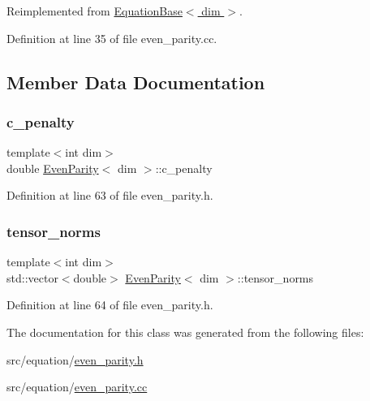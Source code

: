 Reimplemented from \hyperlink{class_equation_base_a39f0465a523e038302f624f89c08a2ee}{Equation\+Base$<$ dim $>$}.



Definition at line 35 of file even\+\_\+parity.\+cc.



\subsection{Member Data Documentation}
\mbox{\label{class_even_parity_a0eeae2ea4837040ebd8df4a997d82acd}} 
\subsubsection{\texorpdfstring{c\+\_\+penalty}{c\_penalty}}
{\footnotesize\ttfamily template$<$int dim$>$ \\
double \hyperlink{class_even_parity}{Even\+Parity}$<$ dim $>$\+::c\+\_\+penalty\hspace{0.3cm}{\ttfamily [private]}}



Definition at line 63 of file even\+\_\+parity.\+h.

\mbox{\label{class_even_parity_aca63481c4a5de27e6acc2fc72d802303}} 
\subsubsection{\texorpdfstring{tensor\+\_\+norms}{tensor\_norms}}
{\footnotesize\ttfamily template$<$int dim$>$ \\
std\+::vector$<$double$>$ \hyperlink{class_even_parity}{Even\+Parity}$<$ dim $>$\+::tensor\+\_\+norms\hspace{0.3cm}{\ttfamily [private]}}



Definition at line 64 of file even\+\_\+parity.\+h.



The documentation for this class was generated from the following files\+:\begin{DoxyCompactItemize}
\item 
src/equation/\hyperlink{even__parity_8h}{even\+\_\+parity.\+h}\item 
src/equation/\hyperlink{even__parity_8cc}{even\+\_\+parity.\+cc}\end{DoxyCompactItemize}

